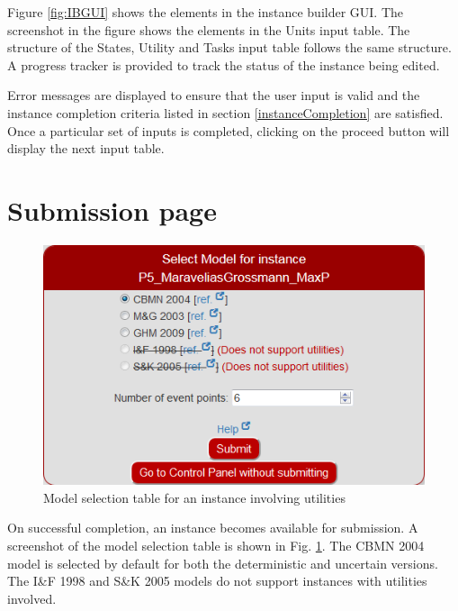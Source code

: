 Figure \ref{fig:IBGUI} shows the elements in the instance builder GUI. The screenshot in the figure shows the elements in the Units input table. The structure of the States, Utility and Tasks input table follows the same structure. A progress tracker is provided to track the status of the instance being edited. 

Error messages are displayed to ensure that the user input is valid and the instance completion criteria listed in section \ref{instanceCompletion} are satisfied.
 Once a particular set of inputs is completed, clicking on the proceed button will display the next input table.






\section{Submission page}

\begin{figure}[htbp]
\centering
\includegraphics[width=0.8\linewidth]{Images/SelectModelUtilities.png}
\caption{Model selection table for an instance involving utilities}
\label{fig:selectModel}
\end{figure}

On successful completion, an instance becomes available for submission. A screenshot of the model selection table is shown in Fig. \ref{fig:selectModel}. The CBMN 2004 model is selected by default for both the deterministic and uncertain versions. The I\&F 1998 and S\&K 2005 models do not support instances with utilities involved.



